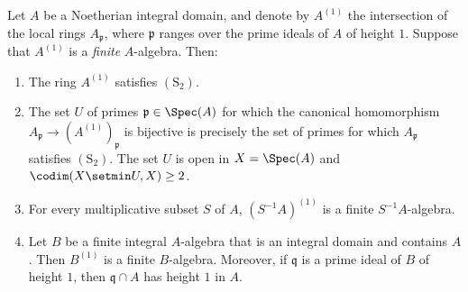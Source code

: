 \begin{proposition}[5.10.17]
\label{IV.5.10.17}
Let $A$ be a Noetherian integral domain, and denote by $A^{(1)}$
the intersection of the local rings $A_{\mathfrak p}$, where
$\mathfrak p$ ranges over the prime ideals of $A$ of height $1$.
Suppose that $A^{(1)}$ is a \emph{finite} $A$-algebra.  Then:
\begin{enumerate}[{\rm(i)}]
  \item The ring $A^{(1)}$ satisfies $(\mathrm S_2)$.
  \item The set $U$ of primes $\mathfrak p\in\Spec(A)$ for which
  the canonical homomorphism $A_{\mathfrak p}\longrightarrow(A^{(1)})_{\mathfrak p}$
  is bijective is precisely the set of primes for which
  $A_{\mathfrak p}$ satisfies $(\mathrm S_2)$.  The set $U$ is
  open in $X=\Spec(A)$ and $\codim(X\setmin U,X)\geq2$.
  \item For every multiplicative subset $S$ of $A$,
  $(S^{-1}A)^{(1)}$ is a finite $S^{-1}A$-algebra.
  \item Let $B$ be a finite integral $A$-algebra that is an
  integral domain and contains $A$.  Then $B^{(1)}$ is a finite
  $B$-algebra.  Moreover, if $\mathfrak q$ is a prime ideal of
  $B$ of height $1$, then $\mathfrak q\cap A$ has height $1$ in
  $A$.
\end{enumerate}
\end{proposition}

